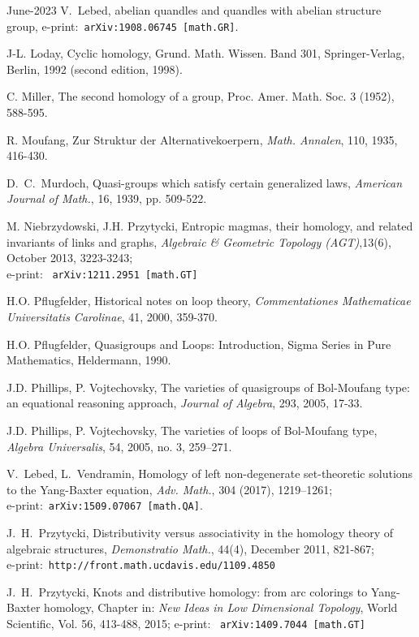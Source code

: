 \documentclass[11pt]{amsart}
\theoremstyle{definition}
\begin{document}
\begin{thebibliography}{June-2023}
 V.~Lebed, abelian quandles and quandles with abelian structure group,
e-print:\ {\tt  arXiv:1908.06745 [math.GR]}.

 J-L. Loday, Cyclic homology,  Grund. Math. Wissen.
Band 301, Springer-Verlag, Berlin, 1992 (second edition, 1998).

 C. Miller, The second homology of a group, Proc. Amer. Math. Soc. 3 (1952), 588-595.

 R. Moufang, Zur Struktur der Alternativekoerpern, {\it Math. Annalen}, 110, 1935, 416-430.

 D.~C.~Murdoch,
Quasi-groups which satisfy certain generalized laws, {\it American
Journal of Math.}, 16, 1939, pp. 509-522.

 M. Niebrzydowski, J.H. Przytycki,
Entropic magmas, their homology, and related invariants of links and graphs,
{\it Algebraic \& Geometric Topology (AGT)},13(6), October 2013, 3223-3243;\\
e-print: \ {\tt arXiv:1211.2951 [math.GT]}

 H.O. Pflugfelder, Historical notes on loop theory, {\it Commentationes Mathematicae Universitatis Carolinae}, 41, 2000, 359-370.

 H.O. Pflugfelder, Quasigroups and Loops: Introduction, Sigma Series in Pure Mathematics, Heldermann, 1990.

 J.D. Phillips, P. Vojtechovsky, The varieties of quasigroups of Bol-Moufang type: an equational reasoning approach, {\it Journal of Algebra}, 293, 2005, 17-33. 

 J.D. Phillips, P. Vojtechovsky,  The varieties of loops of Bol-Moufang type, {\it Algebra Universalis}, 54, 2005, no. 3, 259–271.

 V.~Lebed, L.~Vendramin,
Homology of left non-degenerate set-theoretic solutions to the Yang-Baxter equation, {\it Adv. Math.}, 304 (2017), 1219--1261; \\
e-print:\ {\tt  arXiv:1509.07067 [math.QA]}.

J.~H.~Przytycki, Distributivity versus associativity in the homology theory of algebraic structures,
 {\it Demonstratio Math.}, 44(4), December 2011, 821-867; \\
 e-print:\ {\tt http://front.math.ucdavis.edu/1109.4850}

J.~H.~Przytycki, Knots and distributive homology: from arc colorings to Yang-Baxter homology,
 Chapter in: {\it New Ideas in Low Dimensional Topology}, World Scientific, Vol. 56, 413-488, 2015;
e-print: \ {\tt arXiv:1409.7044 [math.GT]}


\end{thebibliography}
\end{document}
